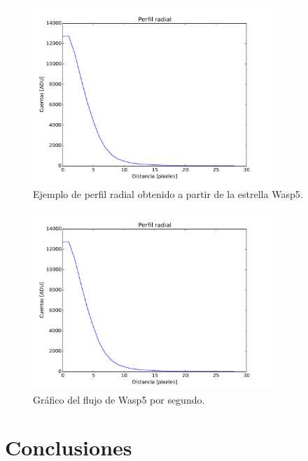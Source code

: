 \documentclass[a4paper, 11pt, spanish]{article}
\begin{document}
\begin{figure}[!htbp]
	\centering
	\includegraphics[width=0.8\textwidth]{img/radial_prof.pdf}
	\caption{Ejemplo de perfil radial obtenido a partir de la estrella Wasp5.}
	\label{fig:rad}
\end{figure}

\begin{figure}[!htbp]
	\centering
	\includegraphics[width=0.8\textwidth]{img/radial_prof.pdf}
	\caption{Gr\'afico del flujo de Wasp5 por segundo.}
	\label{star}
\end{figure}






\section{Conclusiones}

\end{document}
